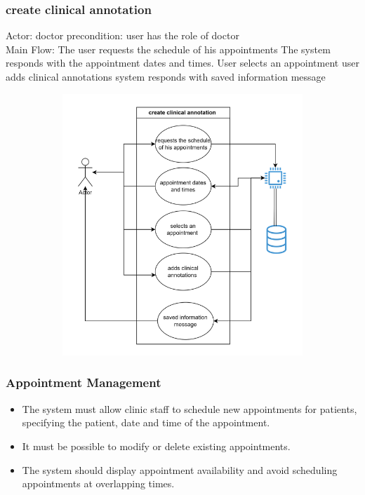 \documentclass{scrreprt}
\begin{document}
	\subsubsection{ create clinical annotation }
	Actor: doctor
	precondition: user has the role of doctor\\
	Main Flow:
	The user requests the schedule of his appointments 
	The system responds with the appointment dates and times.
	User selects an appointment 
	user adds clinical annotations 
	system responds with saved information message
	\begin{figure}[h]
		\begin{center}
			\includegraphics[width=350pt,height=280pt]{usuario6.png}
		\end{center}
		\label{fig:Use case 6}
	\end{figure}
	\pagebreak
	

	
	\subsubsection{Appointment Management}
	\begin{itemize}
	\item The system must allow clinic staff to schedule new appointments for patients, specifying the patient, date and time of the appointment.
	\item	It must be possible to modify or delete existing appointments.
	\item	The system should display appointment availability and avoid scheduling appointments at overlapping times.
	\end{itemize}
	 
\end{document}
